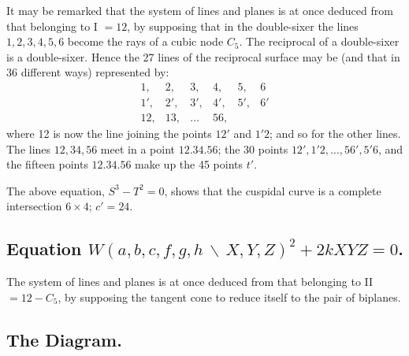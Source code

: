 \documentclass[11pt,a4paper]{article}
\begin{document}
It may be remarked that the system of lines and planes is at once deduced from that belonging to I $= 12$, by supposing that in the double-sixer the lines $1, 2, 3, 4, 5, 6$ become the rays of a cubic node $C_5$. The reciprocal of a double-sixer is a double-sixer. Hence the 27 lines of the reciprocal surface may be (and that in 36 different ways) represented by:
\begin{equation*}
\begin{array}{cccccc}
1, & 2, & 3, & 4, & 5, & 6 \\
1', & 2', & 3', & 4', & 5', & 6' \\
12, & 13, & \ldots & 56, & &
\end{array}
\end{equation*}
where 12 is now the line joining the points $12'$ and $1'2$; and so for the other lines. The lines $12, 34, 56$ meet in a point $12.34.56$; the 30 points $12', 1'2, \ldots, 56', 5'6$, and the fifteen points $12.34.56$ make up the 45 points $t'$.

The above equation, $S^3 - T^2 = 0$, shows that the cuspidal curve is a complete intersection $6 \times 4$; $c' = 24$.

\subsection*{Equation $W(a,b,c,f,g,h \,\backslash\, X,Y,Z)^2 + 2kXYZ = 0$.}

The system of lines and planes is at once deduced from that belonging to II $= 12 - C_5$, by supposing the tangent cone to reduce itself to the pair of biplanes.

\subsection*{The Diagram.}
\end{document}
